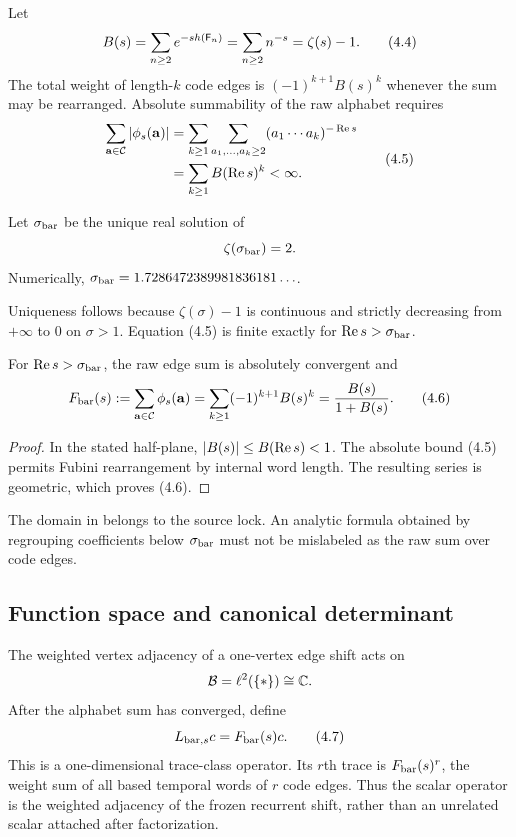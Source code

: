 Let
\[
  B(s)=\sum_{n\ge2}e^{-s h(\mathsf F_n)}
      =\sum_{n\ge2}n^{-s}=\zeta(s)-1.
  \tag{4.4}
\]
The total weight of length-$k$ code edges is $(-1)^{k+1}B(s)^k$ whenever the
sum may be rearranged.  Absolute summability of the raw alphabet requires
\[
\begin{split}
  \sum_{\mathbf a\in\mathcal C}|\phi_s(\mathbf a)|
  &=\sum_{k\ge1}\sum_{a_1,\ldots,a_k\ge2}
    (a_1\cdots a_k)^{-\operatorname{Re} s}\\
  &=\sum_{k\ge1}B(\operatorname{Re} s)^k<\infty.
\end{split}
\tag{4.5}
\]

\begin{definition}
Let $\sigma_{\rm bar}$ be the unique real solution of
\[
  \zeta(\sigma_{\rm bar})=2.
\]
Numerically,
$\sigma_{\rm bar}=1.7286472389981836181\ldots$.
\end{definition}

Uniqueness follows because $\zeta(\sigma)-1$ is continuous and strictly
decreasing from $+\infty$ to $0$ on $\sigma>1$.  Equation (4.5) is finite
exactly for $\operatorname{Re} s>\sigma_{\rm bar}$.

\begin{proposition}
\label{prop:raw}
For $\operatorname{Re} s>\sigma_{\rm bar}$, the raw edge sum is absolutely convergent and
\[
  F_{\rm bar}(s)
  :=\sum_{\mathbf a\in\mathcal C}\phi_s(\mathbf a)
  =\sum_{k\ge1}(-1)^{k+1}B(s)^k
  =\frac{B(s)}{1+B(s)}.
  \tag{4.6}
\]
\end{proposition}

\begin{proof}
In the stated half-plane, $|B(s)|\le B(\operatorname{Re} s)<1$.  The absolute bound (4.5)
permits Fubini rearrangement by internal word length.  The resulting series
is geometric, which proves (4.6).
\end{proof}

The domain in  belongs to the source lock.  An analytic formula
obtained by regrouping coefficients below $\sigma_{\rm bar}$ must not be mislabeled as
the raw sum over code edges.

\subsection{Function space and canonical determinant}

The weighted vertex adjacency of a one-vertex edge shift acts on
\[
  \mathcal B=\ell^2(\{*\})\cong\mathbb C.
\]
After the alphabet sum has converged, define
\[
  L_{\mathrm{bar},s}c=F_{\rm bar}(s)c.
  \tag{4.7}
\]
This is a one-dimensional trace-class operator.  Its $r$th trace is
$F_{\rm bar}(s)^r$, the weight sum of all based temporal words of $r$ code edges.
Thus the scalar operator is the weighted adjacency of the frozen recurrent
shift, rather than an unrelated scalar attached after factorization.

